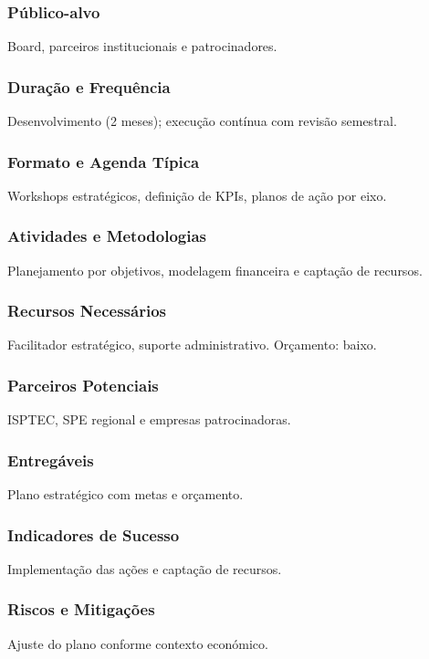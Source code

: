 \documentclass[12pt,a4paper]{article}
\begin{document}
\subsubsection*{Público-alvo}
Board, parceiros institucionais e patrocinadores.

\subsubsection*{Duração e Frequência}
Desenvolvimento (2 meses); execução contínua com revisão semestral.

\subsubsection*{Formato e Agenda Típica}
Workshops estratégicos, definição de KPIs, planos de ação por eixo.

\subsubsection*{Atividades e Metodologias}
Planejamento por objetivos, modelagem financeira e captação de recursos.

\subsubsection*{Recursos Necessários}
Facilitador estratégico, suporte administrativo. Orçamento: baixo.

\subsubsection*{Parceiros Potenciais}
ISPTEC, SPE regional e empresas patrocinadoras.

\subsubsection*{Entregáveis}
Plano estratégico com metas e orçamento.

\subsubsection*{Indicadores de Sucesso}
Implementação das ações e captação de recursos.

\subsubsection*{Riscos e Mitigações}
Ajuste do plano conforme contexto económico.
\end{document}
